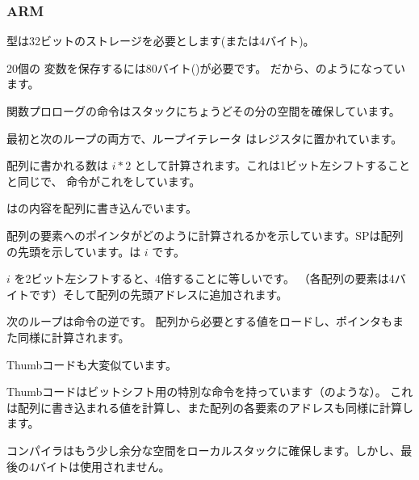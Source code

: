 ﻿\subsubsection{ARM}

\myparagraph{\NonOptimizingKeilVI (\ARMMode)}



\Tint 型は32ビットのストレージを必要とします(または4バイト)。

20個の \Tint 変数を保存するには80バイト()が必要です。
だから、のようになっています。

関数プロローグの命令はスタックにちょうどその分の空間を確保しています。

最初と次のループの両方で、ループイテレータ  はレジスタに置かれています。


配列に書かれる数は $i*2$ として計算されます。これは1ビット左シフトすることと同じで、
命令がこれをしています。

はの内容を配列に書き込んでいます。

配列の要素へのポインタがどのように計算されるかを示しています。\ac{SP}は配列の先頭を示しています。は $i$ です。

$i$ を2ビット左シフトすると、4倍することに等しいです。
（各配列の要素は4バイトです）そして配列の先頭アドレスに追加されます。


次のループは命令の逆です。
配列から必要とする値をロードし、ポインタもまた同様に計算されます。

\myparagraph{\OptimizingKeilVI (\ThumbMode)}



Thumbコードも大変似ています。

Thumbコードはビットシフト用の特別な命令を持っています（のような）。
これは配列に書き込まれる値を計算し、また配列の各要素のアドレスも同様に計算します。

コンパイラはもう少し余分な空間をローカルスタックに確保します。しかし、最後の4バイトは使用されません。




